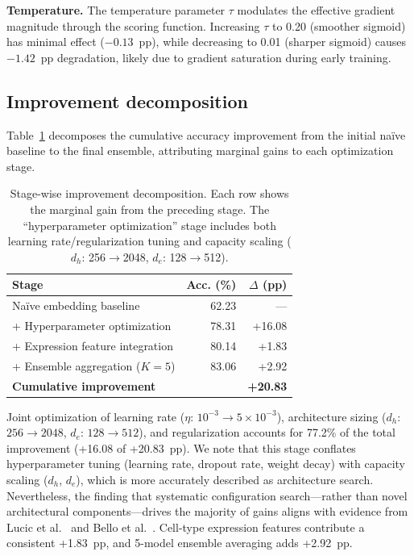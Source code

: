 \documentclass[10pt,twocolumn]{article}
\begin{document}
\textbf{Temperature.}
The temperature parameter $\tau$ modulates the effective gradient magnitude through the scoring function.
Increasing $\tau$ to 0.20 (smoother sigmoid) has minimal effect ($-0.13$~pp), while decreasing to 0.01 (sharper sigmoid) causes $-1.42$~pp degradation, likely due to gradient saturation during early training.

\subsection{Improvement decomposition}
\label{sec:trajectory}

Table~\ref{tab:trajectory} decomposes the cumulative accuracy improvement from the initial na\"{i}ve baseline to the final ensemble, attributing marginal gains to each optimization stage.

\begin{table}[!htbp]
\centering
\caption{Stage-wise improvement decomposition. Each row shows the marginal gain from the preceding stage. The ``hyperparameter optimization'' stage includes both learning rate/regularization tuning and capacity scaling ($d_h$: 256$\to$2048, $d_e$: 128$\to$512).}
\label{tab:trajectory}
\small
\begin{tabular}{@{}lrr@{}}
\toprule
\textbf{Stage} & \textbf{Acc. (\%)} & \textbf{$\Delta$ (pp)} \\
\midrule
Na\"{i}ve embedding baseline & 62.23 & --- \\
+ Hyperparameter optimization & 78.31 & +16.08 \\
+ Expression feature integration & 80.14 & +1.83 \\
+ Ensemble aggregation ($K{=}5$) & 83.06 & +2.92 \\
\midrule
\textbf{Cumulative improvement} & & \textbf{+20.83} \\
\bottomrule
\end{tabular}
\end{table}

Joint optimization of learning rate ($\eta$: $10^{-3} \to 5 \times 10^{-3}$), architecture sizing ($d_h$: $256 \to 2048$, $d_e$: $128 \to 512$), and regularization accounts for 77.2\% of the total improvement (+16.08 of +20.83~pp).
We note that this stage conflates hyperparameter tuning (learning rate, dropout rate, weight decay) with capacity scaling ($d_h$, $d_e$), which is more accurately described as architecture search.
Nevertheless, the finding that systematic configuration search---rather than novel architectural components---drives the majority of gains aligns with evidence from Lucic et al.~\cite{lucic2018gans} and Bello et al.~\cite{bello2021revisiting}.
Cell-type expression features contribute a consistent +1.83~pp, and 5-model ensemble averaging adds +2.92~pp.
\end{document}
